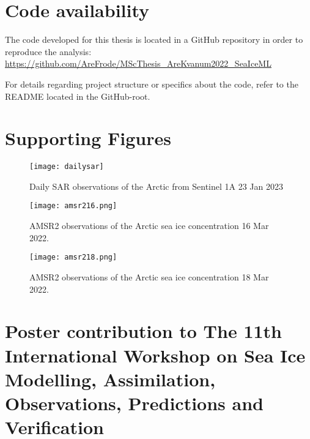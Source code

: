 \documentclass[../main/thesis.tex]{subfiles}
\begin{document}
\section{Code availability}
The code developed for this thesis is located in a GitHub repository in order to reproduce the analysis: \\
\url{https://github.com/AreFrode/MScThesis_AreKvanum2022_SeaIceML}

For details regarding project structure or specifics about the code, refer to the README located in the GitHub-root.

\newpage

\section{Supporting Figures}

\begin{figure}[h]
    \centering
    \texttt{[image: dailysar]}
    \caption{\label{fig:S-sar}Daily SAR observations of the Arctic from Sentinel 1A 23 Jan 2023}
\end{figure}

\begin{figure}
    \centering
    \texttt{[image: amsr216.png]}
    \caption{\label{fig:S-amsr2-16}AMSR2 observations of the Arctic sea ice concentration 16 Mar 2022.}
\end{figure}

\begin{figure}
    \centering
    \texttt{[image: amsr218.png]}
    \caption{\label{fig:S-amsr2-18}AMSR2 observations of the Arctic sea ice concentration 18 Mar 2022.}
\end{figure}

\newpage

\section{Poster contribution to The 11th International Workshop on Sea Ice Modelling, Assimilation, Observations, Predictions and Verification}


\end{document}
